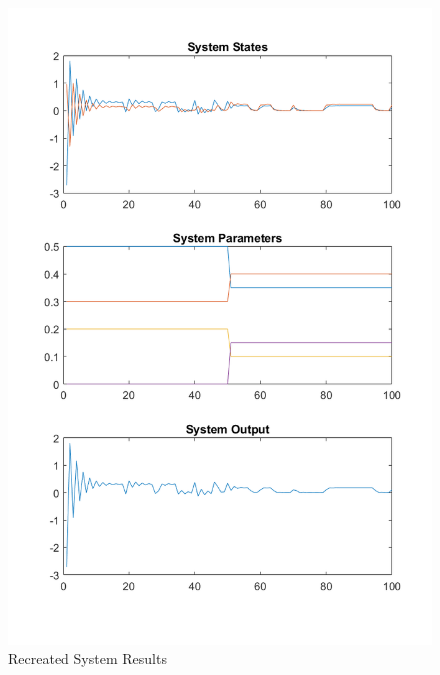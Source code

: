 \documentclass[]{article}
\begin{document}
\begin{figure}
	\centering
	\includegraphics[width=\linewidth]{../../fig/SystemResponse_no_attack}
	\caption{Recreated System Results}
	\label{fig:systemresponsenoattack}
\end{figure}
\end{document}
